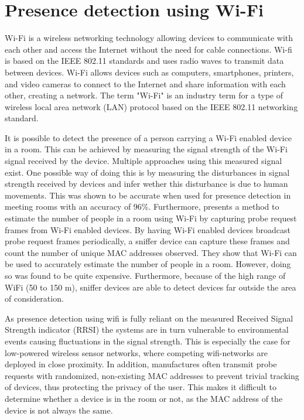 \section{Presence detection using Wi-Fi} \label{sec:wi-fi}
Wi-Fi is a wireless networking technology allowing devices to communicate with each other and access the Internet without the need for cable connections. 
Wi-fi is based on the IEEE 802.11\cite{iEEE80211} standards and uses radio waves to transmit data between devices.
Wi-Fi allows devices such as computers, smartphones, printers, and video cameras to connect to the Internet and share information with each other, creating a network.
The term "Wi-Fi" is an industry term for a type of wireless local area network (LAN) protocol based on the IEEE 802.11 networking standard.\cite{WiFiAllianceDiscover,CiscoWhatIsWiFi}

It is possible to detect the presence of a person carrying a Wi-Fi enabled device in a room.
This can be achieved by measuring the signal strength of the Wi-Fi signal received by the device.
Multiple approaches using this measured signal exist. 
One possible way of doing this is by measuring the disturbances in signal strength received by devices and infer wether this disturbance is due to human movements. 
This was shown to be accurate when used for presence detection in meeting rooms with an accuracy of 96\%. \cite{wifi_presence_detection_df}
Furthermore,\citeauthor{longoAccurateOccupancyEstimation2019}\cite{longoAccurateOccupancyEstimation2019} presents a method to estimate the number of people in a room using Wi-Fi by capturing probe request frames from Wi-Fi enabled devices.
By having Wi-Fi enabled devices broadcast probe request frames periodically, a sniffer device can capture these frames and count the number of unique MAC addresses observed.
They show that Wi-Fi can be used to accurately estimate the number of people in a room.
However, doing so was found to be quite expensive.
Furthermore, because of the high range of WiFi (50 to 150 m), sniffer devices are able to detect devices far outside the area of consideration.\cite{longoAccurateOccupancyEstimation2019}

As presence detection using wifi is fully reliant on the measured Received Signal Strength indicator (RRSI) the systems are in turn vulnerable to environmental events causing fluctuations in the signal strength.
This is especially the case for low-powered wireless sensor networks, where competing wifi-networks are deployed in close proximity.\cite{competing_wifi}
In addition, manufactures often transmit probe requests with randomized, non-existing MAC addresses to prevent trivial tracking of devices, thus protecting the privacy of the user.
This makes it difficult to determine whether a device is in the room or not, as the MAC address of the device is not always the same.\cite{longoAccurateOccupancyEstimation2019}
